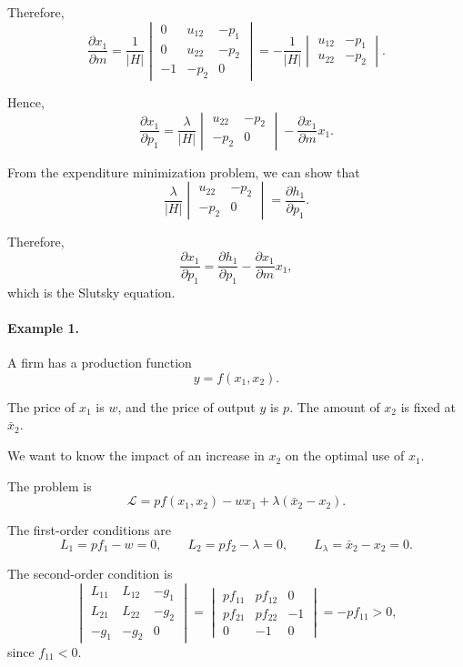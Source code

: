 Therefore,
\[
\frac{\partial x_1}{\partial m}
=
\frac{1}{|H|}
\begin{vmatrix}
0 & u_{12} & -p_1 \\
0 & u_{22} & -p_2 \\
-1 & -p_2 & 0
\end{vmatrix}
=
-\frac{1}{|H|}
\begin{vmatrix}
u_{12} & -p_1 \\
u_{22} & -p_2
\end{vmatrix}.
\]

Hence,
\[
\frac{\partial x_1}{\partial p_1}
=
\frac{\lambda}{|H|}
\begin{vmatrix}
u_{22} & -p_2 \\
-p_2 & 0
\end{vmatrix}
-
\frac{\partial x_1}{\partial m}x_1.
\]

From the expenditure minimization problem, we can show that
\[
\frac{\lambda}{|H|}
\begin{vmatrix}
u_{22} & -p_2 \\
-p_2 & 0
\end{vmatrix}
=
\frac{\partial h_1}{\partial p_1}.
\]

Therefore,
\[
\frac{\partial x_1}{\partial p_1}
=
\frac{\partial h_1}{\partial p_1}
-
\frac{\partial x_1}{\partial m}x_1,
\]
which is the Slutsky equation.

\paragraph{Example 1.}
A firm has a production function
\[
y=f(x_1,x_2).
\]

The price of \(x_1\) is \(w\), and the price of output \(y\) is \(p\). The amount of \(x_2\) is fixed at \(\bar{x}_2\).

We want to know the impact of an increase in \(x_2\) on the optimal use of \(x_1\).

The problem is
\[
\mathcal{L}
=
pf(x_1,x_2)
-
wx_1
+
\lambda(\bar{x}_2-x_2).
\]

The first-order conditions are
\[
L_1=pf_1-w=0,
\qquad
L_2=pf_2-\lambda=0,
\qquad
L_{\lambda}=\bar{x}_2-x_2=0.
\]

The second-order condition is
\[
\begin{vmatrix}
L_{11} & L_{12} & -g_1 \\
L_{21} & L_{22} & -g_2 \\
-g_1 & -g_2 & 0
\end{vmatrix}
=
\begin{vmatrix}
pf_{11} & pf_{12} & 0 \\
pf_{21} & pf_{22} & -1 \\
0 & -1 & 0
\end{vmatrix}
=
-pf_{11}>0,
\]
since \(f_{11}<0\).

